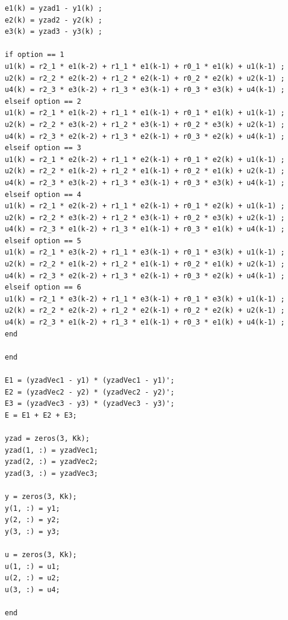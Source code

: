 \documentclass[a4paper,titlepage,11pt,twosides,floatssmall]{mwrep}
\begin{document}
\begin{lstlisting}[style=Matlab-editor]
e1(k) = yzad1 - y1(k) ;
e2(k) = yzad2 - y2(k) ;
e3(k) = yzad3 - y3(k) ;

if option == 1
u1(k) = r2_1 * e1(k-2) + r1_1 * e1(k-1) + r0_1 * e1(k) + u1(k-1) ;
u2(k) = r2_2 * e2(k-2) + r1_2 * e2(k-1) + r0_2 * e2(k) + u2(k-1) ;
u4(k) = r2_3 * e3(k-2) + r1_3 * e3(k-1) + r0_3 * e3(k) + u4(k-1) ;
elseif option == 2
u1(k) = r2_1 * e1(k-2) + r1_1 * e1(k-1) + r0_1 * e1(k) + u1(k-1) ;
u2(k) = r2_2 * e3(k-2) + r1_2 * e3(k-1) + r0_2 * e3(k) + u2(k-1) ;
u4(k) = r2_3 * e2(k-2) + r1_3 * e2(k-1) + r0_3 * e2(k) + u4(k-1) ;
elseif option == 3
u1(k) = r2_1 * e2(k-2) + r1_1 * e2(k-1) + r0_1 * e2(k) + u1(k-1) ;
u2(k) = r2_2 * e1(k-2) + r1_2 * e1(k-1) + r0_2 * e1(k) + u2(k-1) ;
u4(k) = r2_3 * e3(k-2) + r1_3 * e3(k-1) + r0_3 * e3(k) + u4(k-1) ;
elseif option == 4
u1(k) = r2_1 * e2(k-2) + r1_1 * e2(k-1) + r0_1 * e2(k) + u1(k-1) ;
u2(k) = r2_2 * e3(k-2) + r1_2 * e3(k-1) + r0_2 * e3(k) + u2(k-1) ;
u4(k) = r2_3 * e1(k-2) + r1_3 * e1(k-1) + r0_3 * e1(k) + u4(k-1) ;
elseif option == 5
u1(k) = r2_1 * e3(k-2) + r1_1 * e3(k-1) + r0_1 * e3(k) + u1(k-1) ;
u2(k) = r2_2 * e1(k-2) + r1_2 * e1(k-1) + r0_2 * e1(k) + u2(k-1) ;
u4(k) = r2_3 * e2(k-2) + r1_3 * e2(k-1) + r0_3 * e2(k) + u4(k-1) ;
elseif option == 6
u1(k) = r2_1 * e3(k-2) + r1_1 * e3(k-1) + r0_1 * e3(k) + u1(k-1) ;
u2(k) = r2_2 * e2(k-2) + r1_2 * e2(k-1) + r0_2 * e2(k) + u2(k-1) ;
u4(k) = r2_3 * e1(k-2) + r1_3 * e1(k-1) + r0_3 * e1(k) + u4(k-1) ;
end

end

E1 = (yzadVec1 - y1) * (yzadVec1 - y1)';
E2 = (yzadVec2 - y2) * (yzadVec2 - y2)';
E3 = (yzadVec3 - y3) * (yzadVec3 - y3)';
E = E1 + E2 + E3;

yzad = zeros(3, Kk);
yzad(1, :) = yzadVec1;
yzad(2, :) = yzadVec2;
yzad(3, :) = yzadVec3;

y = zeros(3, Kk);
y(1, :) = y1;
y(2, :) = y2;
y(3, :) = y3;

u = zeros(3, Kk);
u(1, :) = u1;
u(2, :) = u2;
u(3, :) = u4;

end

\end{lstlisting}
\end{document}
